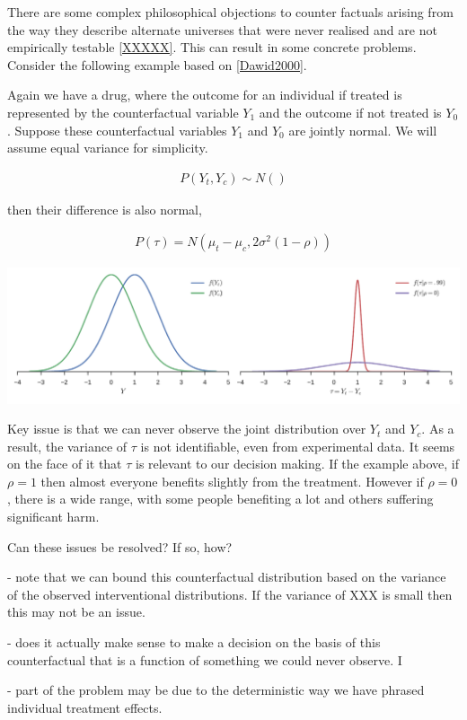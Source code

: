 \documentclass[11pt,a4paper,oneside]{book}
\newcommand{\eq}[1]{\begin{align*}#1\end{align*}}
\newcommand{\cf}[2]{{#1}_{#2}}
\theoremstyle{plain}
\theoremstyle{definition}
\begin{document}

There are some complex philosophical objections to counter factuals arising from the way they describe alternate universes that were never realised and are not empirically testable \ref{XXXXX}. This can result in some concrete problems. Consider the following example based on  \ref{Dawid2000}.

Again we have a drug, where the outcome for an individual if treated is represented by the counterfactual variable $\cf{Y}{1}$ and the outcome if not treated is $\cf{Y}{0}$. Suppose these counterfactual variables $\cf{Y}{1}$ and $\cf{Y}{0}$ are jointly normal. We will assume equal variance for simplicity.

\eq{
P(Y_t,Y_c) \sim N()
}

then their difference is also normal,

\eq{
P(\tau) = N(\mu_t - \mu_c,2\sigma^{2}(1-\rho))
}

\includegraphics[scale=.6]{figures/counterfactual_nonidentify.pdf}

Key issue is that we can never observe the joint distribution over $Y_t$ and $Y_c$. As a result, the variance of $\tau$ is not identifiable, even from experimental data. It seems on the face of it that $\tau$ is relevant to our decision making. If the example above, if $\rho = 1$ then almost everyone benefits slightly from the treatment. However if $\rho=0$, there is a wide range, with some people benefiting a lot and others suffering significant harm.  

Can these issues be resolved? If so, how? 

- note that we can bound this counterfactual distribution based on the variance of the observed interventional distributions. If the variance of XXX is small then this may not be an issue. 

- does it actually make sense to make a decision on the basis of this counterfactual that is a function of something we could never observe. I

- part of the problem may be due to the deterministic way we have phrased individual treatment effects. 
\end{document}
